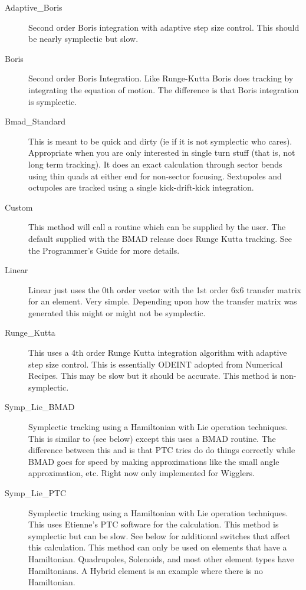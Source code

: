 \begin{description}
\item[Adaptive\_Boris]
Second order Boris integration with adaptive step size control.
This should be nearly symplectic but slow.

\item[Boris]
Second order Boris Integration. Like Runge-Kutta Boris does tracking by
integrating the equation of motion. The difference is that Boris integration
is symplectic.

\item[Bmad\_Standard]
This is meant to be quick and dirty (ie if it is not symplectic
who cares). Appropriate when you are only interested in single turn stuff
(that is, not long term tracking). It
does an exact calculation through sector bends using thin quads at either end
for non-sector focusing. Sextupoles and octupoles are tracked using a single
kick-drift-kick integration.

\item[Custom]
This method will call a routine  which can be supplied by
the user. The default  supplied with the BMAD release does
Runge Kutta tracking. See the Programmer's Guide for more details.

\item[Linear]
Linear just uses the 0th order vector with the 1st order 6x6 transfer
matrix for an element. Very simple.  Depending upon how the transfer
matrix was generated this might or might not be symplectic.

\item[Runge\_Kutta]
This uses a 4th order Runge Kutta integration algorithm with adaptive
step size control.  This is essentially ODEINT adopted from Numerical
Recipes. This may be slow but it should be accurate. This method is
non-symplectic.

\item[Symp\_Lie\_BMAD]
Symplectic tracking using a Hamiltonian with Lie operation techniques.
This is similar to  (see below) except this uses a
BMAD routine.  The difference between this and  is
that PTC tries do do things correctly while BMAD goes for speed by
making approximations like the small angle approximation, etc. Right
now only implemented for Wigglers.

\item[Symp\_Lie\_PTC]
Symplectic tracking using a Hamiltonian with Lie operation techniques.
This uses Etienne's PTC software for the calculation. This method is
symplectic but can be slow. See below for additional switches that affect this
calculation. This method can only be used on elements that have a Hamiltonian.
Quadrupoles, Solenoids, and most other element types have Hamiltonians. A
Hybrid element is an  example where there is no Hamiltonian.


\end{description}
